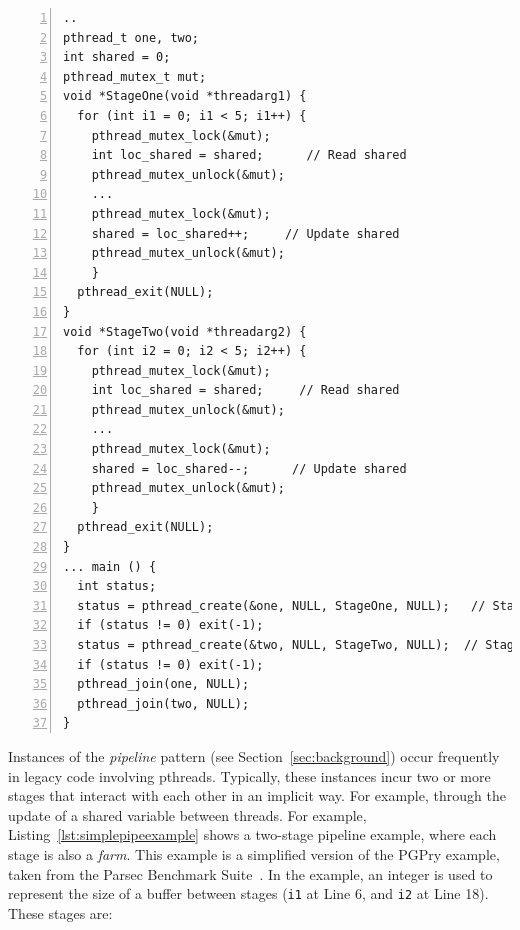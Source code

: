 \begin{lstlisting}[frame=single,numbers=left,label=lst:simplepipeexample,caption={Simple pipeline example, based on PGPry, from the Parsec benchmark suite.}]
..
pthread_t one, two;
int shared = 0;
pthread_mutex_t mut;
void *StageOne(void *threadarg1) {
  for (int i1 = 0; i1 < 5; i1++) {
    pthread_mutex_lock(&mut);
    int loc_shared = shared;      // Read shared
    pthread_mutex_unlock(&mut);
    ...
    pthread_mutex_lock(&mut);
    shared = loc_shared++;     // Update shared
    pthread_mutex_unlock(&mut);
    }
  pthread_exit(NULL);
}
void *StageTwo(void *threadarg2) {
  for (int i2 = 0; i2 < 5; i2++) { 
    pthread_mutex_lock(&mut);
    int loc_shared = shared;     // Read shared
    pthread_mutex_unlock(&mut);
    ...
    pthread_mutex_lock(&mut);
    shared = loc_shared--;      // Update shared
    pthread_mutex_unlock(&mut);
    }
  pthread_exit(NULL);
}
... main () {
  int status;
  status = pthread_create(&one, NULL, StageOne, NULL);   // Stage One
  if (status != 0) exit(-1);
  status = pthread_create(&two, NULL, StageTwo, NULL);  // Stage Two
  if (status != 0) exit(-1);
  pthread_join(one, NULL);
  pthread_join(two, NULL);
}
\end{lstlisting}


\noindent
Instances of the \emph{pipeline} pattern (see Section~\ref{sec:background}) occur frequently in legacy code involving pthreads. Typically, these instances incur two or more stages that interact with each other in an implicit way. For example, through the update of a shared variable between threads. For example, Listing~\ref{lst:simplepipeexample} shows a two-stage pipeline example, where each stage is also a \emph{farm}. This example is a simplified version of the PGPry example, taken from the Parsec Benchmark Suite~\cite{10.1145/1454115.1454128}. In the example, an integer is used to represent the size of a buffer between stages (\lstinline|i1| at Line 6, and \lstinline|i2| at Line 18).
These stages are:

